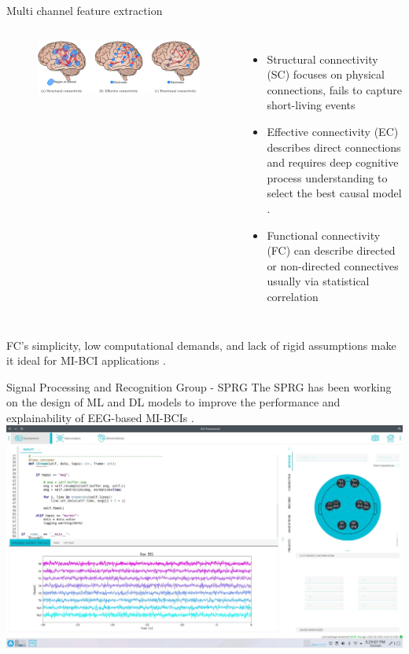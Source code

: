 \documentclass[aspectratio=169]{beamer}
\let\oldcite\cite %
\renewcommand{\cite}[1]{{\tiny\oldcite{#1}}}
\begin{document}
\begin{frame}{Multi channel feature extraction}
    \begin{columns}
            \begin{figure}[!ht]
                \centering
                \includegraphics[width=1\linewidth]{figures/connectivities.png}
            \end{figure}
            \begin{itemize}
                \item Structural connectivity (SC) focuses on physical connections, fails to capture short-living events \cite{thiebaut2020brain}
                \item Effective connectivity (EC) describes direct connections and requires deep cognitive process understanding to select the best causal model \cite{chiarion2023connectivity}.
                \item Functional connectivity (FC) can describe directed or non-directed connectives usually via statistical correlation \cite{cao2022brain}
            \end{itemize}
    \end{columns}
    \vspace{3em}
    \centering
    FC's simplicity, low computational demands, and lack of rigid assumptions make it ideal for MI-BCI applications \cite{he2019electrophysiological}.
\end{frame}

\begin{frame}{Signal Processing and Recognition Group - SPRG}
    The SPRG has been working on the design of ML and DL models to improve the performance and explainability of EEG-based MI-BCIs \cite{collazos2023posthoc}.
    \centering
    \includegraphics[width=0.7\linewidth]{figures/bcisoft.jpeg}
\end{frame}
\end{document}
